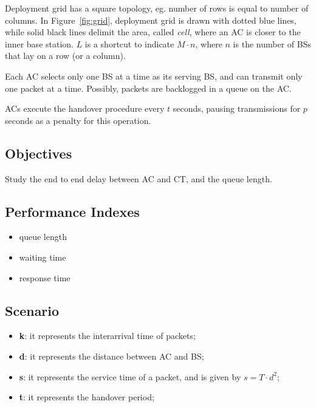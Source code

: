 \documentclass[a4paper,12pt]{article}
\begin{document}
Deployment grid has a square topology, eg. number of rows is equal to number of columns.
In Figure~\ref{fig:grid}, deployment grid is drawn with dotted blue lines, while solid black lines delimit the area, called \emph{cell}, where an AC is closer to the inner base station.
$L$ is a shortcut to indicate $M \cdot n$, where $n$ is the number of BSs that lay on a row (or a column).

Each AC selects only one BS at a time as its serving BS, and can transmit only one packet at a time.
Possibly, packets are backlogged in a queue on the AC.

ACs execute the handover procedure every $t$ seconds, pausing transmissions for $p$ seconds as a penalty for this operation.

\subsection{Objectives}
Study the end to end delay between AC and CT, and the queue length.

\subsection{Performance Indexes}
\begin{itemize}
  \item queue length
  \item waiting time
  \item response time
\end{itemize}

\subsection{Scenario}
\begin{itemize}
  \item \textbf{k}: it represents the interarrival time of packets;
  \item \textbf{d}: it represents the distance between AC and BS;
  \item \textbf{s}: it represents the service time of a packet, and is given by $s = T \cdot d^{2}$;
  \item \textbf{t}: it represents the handover period;
\end{itemize}
\end{document}
